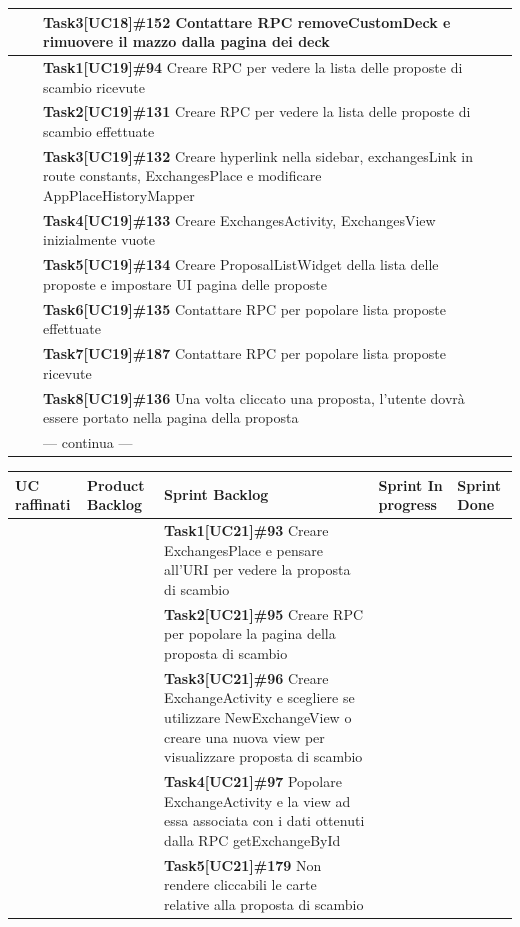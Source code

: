 \documentclass[a4paper, oneside]{article}
\begin{document}
\begin{landscape}
\begin{tabular}{ | p{6.5cm} | p{3cm} | p{8cm} | p{2.9cm} | p{2.4cm}| }
            & & \textbf{Task3[UC18]\#152} Contattare RPC removeCustomDeck e rimuovere il mazzo dalla pagina dei deck  & & \\ \hline
            & & \textbf{Task1[UC19]\#94} Creare RPC per vedere la lista delle proposte di scambio ricevute  & & \\ \hline
            & & \textbf{Task2[UC19]\#131} Creare RPC per vedere la lista delle proposte di scambio effettuate  & & \\ \hline
            & & \textbf{Task3[UC19]\#132} Creare hyperlink nella sidebar, exchangesLink in route constants, ExchangesPlace e modificare AppPlaceHistoryMapper  & & \\ \hline
            & & \textbf{Task4[UC19]\#133} Creare ExchangesActivity, ExchangesView inizialmente vuote  & & \\ \hline
            & & \textbf{Task5[UC19]\#134} Creare ProposalListWidget della lista delle proposte e impostare UI pagina delle proposte  & & \\ \hline
            & & \textbf{Task6[UC19]\#135} Contattare RPC per popolare lista proposte effettuate  & & \\ \hline
            & & \textbf{Task7[UC19]\#187} Contattare RPC per popolare lista proposte ricevute  & & \\ \hline
            & & \textbf{Task8[UC19]\#136} Una volta cliccato una proposta, l'utente dovrà essere portato nella pagina della proposta  & & \\ \hline
            & & --- continua --- & & \\
            \hline
        \end{tabular}
        \newpage
        \small
        \noindent
        \def\arraystretch{2}%
        \begin{tabular}{ | p{6.5cm} | p{3cm} | p{8cm} | p{2.9cm} | p{2.4cm}| }
            \hline
            \textbf{UC raffinati}
            & \textbf{Product Backlog}
            & \textbf{Sprint Backlog}
            & \textbf{Sprint In progress}
            & \textbf{Sprint Done} \\
            \hline
            \hline
            & & \textbf{Task1[UC21]\#93} Creare ExchangesPlace e pensare all'URI per vedere la proposta di scambio & & \\ \hline
            & & \textbf{Task2[UC21]\#95} Creare RPC per popolare la pagina della proposta di scambio  & & \\ \hline
            & & \textbf{Task3[UC21]\#96} Creare ExchangeActivity e scegliere se utilizzare NewExchangeView o creare una nuova view per visualizzare proposta di scambio  & & \\ \hline
            & & \textbf{Task4[UC21]\#97} Popolare ExchangeActivity e la view ad essa associata con i dati ottenuti dalla RPC getExchangeById  & & \\ \hline
            & & \textbf{Task5[UC21]\#179} Non rendere cliccabili le carte relative alla proposta di scambio  & & \\ \hline



\end{tabular}
\end{landscape}
\end{document}
